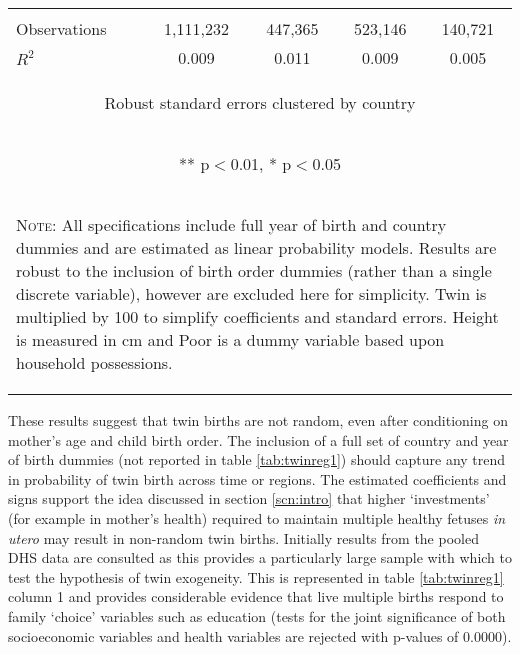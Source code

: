 \documentclass{article}[11pt,subeqn]
\begin{document}
\begin{spacing}{1.5}
\begin{table}[ht]
\begin{center}
\begin{tabular}{lcccc}
\vspace{4pt} & \begin{footnotesize}\end{footnotesize} & \begin{footnotesize}\end{footnotesize} & \begin{footnotesize}\end{footnotesize} & \begin{footnotesize}\end{footnotesize} \\
Observations & 1,111,232 & 447,365 & 523,146 & 140,721 \\
 $R^2$ & 0.009 & 0.011 & 0.009 & 0.005 \\ \midrule
\multicolumn{5}{c}{\begin{footnotesize} Robust standard errors clustered by country \end{footnotesize}} \\
\multicolumn{5}{c}{\begin{footnotesize} ** p$<$0.01, * p$<$0.05 \end{footnotesize}} \\
\bottomrule
\multicolumn{5}{p{10cm}}{\setstretch{0.9}\begin{footnotesize}\textsc{Note:} All specifications include full year of birth and country
dummies and are estimated as linear probability models.  Results are robust to the inclusion of birth order dummies (rather than a single discrete 
variable), however are excluded here for simplicity.  Twin is multiplied by 100 to simplify coefficients and standard errors.  Height is measured
in cm and Poor is a dummy variable based upon household possessions.\end{footnotesize}}\\
\end{tabular}
\end{center}
\end{table}

These results suggest that twin births are not random, even after conditioning on mother's age and child birth order.  The
inclusion of a full set of country and year of birth dummies (not reported in table \ref{tab:twinreg1}) should capture any trend in
probability of twin birth across time or regions.  The estimated coefficients and signs support the idea discussed in section \ref{scn:intro}
that higher `investments' (for example in mother's health) required to maintain multiple healthy fetuses \emph{in utero} may result in 
non-random twin births. 
Initially results from the pooled DHS data are consulted as this provides a particularly large sample with which to test the hypothesis of
twin exogeneity.  This is represented in table \ref{tab:twinreg1} column 1 and provides considerable evidence that live multiple
births respond to family `choice' variables such as education (tests for the joint significance of both socioeconomic variables and health
variables are rejected with p-values of 0.0000).


\end{spacing}
\end{document}
